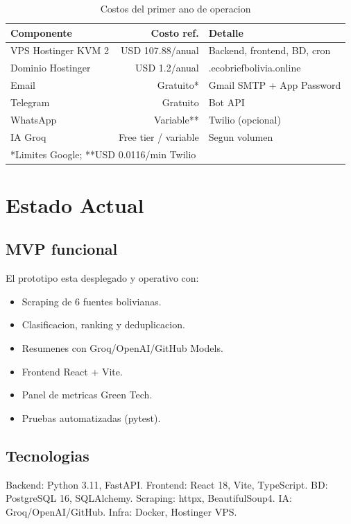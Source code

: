 \documentclass[12pt,oneside]{report}
\begin{document}
\begin{table}[H]
\centering
\begin{tabular}{lrl}
\toprule
\textbf{Componente} & \textbf{Costo ref.} & \textbf{Detalle} \\
\midrule
VPS Hostinger KVM 2 & USD 107.88/anual & Backend, frontend, BD, cron \\
Dominio Hostinger & USD 1.2/anual & .ecobriefbolivia.online \\
Email & Gratuito* & Gmail SMTP + App Password \\
Telegram & Gratuito & Bot API \\
WhatsApp & Variable** & Twilio (opcional) \\
IA Groq & Free tier / variable & Segun volumen \\
\bottomrule
\multicolumn{3}{l}{*Limites Google; **USD 0.0116/min Twilio}
\end{tabular}
\caption{Costos del primer ano de operacion}
\end{table}



\chapter{Estado Actual}

\section{MVP funcional}

El prototipo esta desplegado y operativo con:
\begin{itemize}[nosep]
    \item Scraping de 6 fuentes bolivianas.
    \item Clasificacion, ranking y deduplicacion.
    \item Resumenes con Groq/OpenAI/GitHub Models.
    \item Frontend React + Vite.
    \item Panel de metricas Green Tech.
    \item Pruebas automatizadas (pytest).
\end{itemize}

\section{Tecnologias}

Backend: Python 3.11, FastAPI. Frontend: React 18, Vite, TypeScript. BD: PostgreSQL 16, SQLAlchemy. Scraping: httpx, BeautifulSoup4. IA: Groq/OpenAI/GitHub. Infra: Docker, Hostinger VPS.
\end{document}
